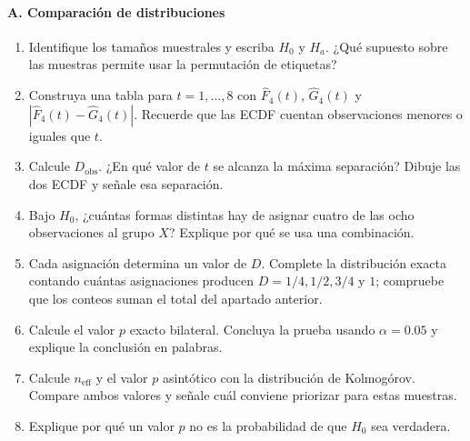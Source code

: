 \paragraph*{A. Comparación de distribuciones}
\begin{enumerate}
  \item Identifique los tamaños muestrales y escriba $H_0$ y $H_a$. ¿Qué supuesto sobre las muestras permite usar la permutación de etiquetas?
  \item Construya una tabla para $t=1,\ldots,8$ con $\widehat F_4(t)$, $\widehat G_4(t)$ y $|\widehat F_4(t)-\widehat G_4(t)|$. Recuerde que las ECDF cuentan observaciones menores o iguales que $t$.
  \item Calcule $D_{\mathrm{obs}}$. ¿En qué valor de $t$ se alcanza la máxima separación? Dibuje las dos ECDF y señale esa separación.
  \item Bajo $H_0$, ¿cuántas formas distintas hay de asignar cuatro de las ocho observaciones al grupo $X$? Explique por qué se usa una combinación.
  \item Cada asignación determina un valor de $D$. Complete la distribución exacta contando cuántas asignaciones producen $D=1/4,1/2,3/4$ y $1$; compruebe que los conteos suman el total del apartado anterior.
  \item Calcule el valor $p$ exacto bilateral. Concluya la prueba usando $\alpha=0.05$ y explique la conclusión en palabras.
  \item Calcule $n_{\mathrm{eff}}$ y el valor $p$ asintótico con la distribución de Kolmogórov. Compare ambos valores y señale cuál conviene priorizar para estas muestras.
  \item Explique por qué un valor $p$ no es la probabilidad de que $H_0$ sea verdadera.
\end{enumerate}

